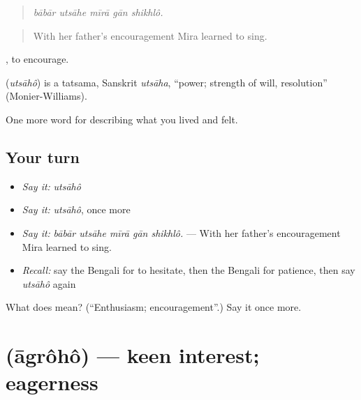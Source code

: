 \begin{quote}
    
\end{quote}

\begin{quote}
\emph{bābār utsāhe mīrā gān shikhlô.}
\end{quote}

\begin{quote}
With her father's encouragement Mira learned to sing.
\end{quote}

 , to encourage.

\begin{cousinweb}
\textbf{} (\emph{utsāhô}) is a tatsama, Sanskrit \emph{utsāha}, \textquotedblleft{}power; strength of will, resolution\textquotedblright{} (Monier-Williams).
\end{cousinweb}

\begin{grammarlens}[title={What you've built}]
One more word for describing what you lived and felt.
\end{grammarlens}

\subsection*{Your turn}
\begin{itemize}
\raggedright
  \item \emph{Say it:} \emph{utsāhô}
  \item \emph{Say it:} \emph{utsāhô}, once more
  \item \emph{Say it:} \emph{bābār utsāhe mīrā gān shikhlô.} — With her father's encouragement Mira learned to sing.
  \item \emph{Recall:} say the Bengali for to hesitate, then the Bengali for patience, then say \emph{utsāhô} again
\end{itemize}

\begin{tcolorbox}[breakable,colback=teal!4,colframe=teal!35!black,title={Before you move on}]
What does  mean? (\textquotedblleft{}Enthusiasm; encouragement\textquotedblright{}.) Say it once more.
\end{tcolorbox}
\section[\texorpdfstring{\bn{আগ্রহ} (āgrôhô)}{আগ্রহ (āgrôhô)}]{ (āgrôhô) — keen interest; eagerness}

